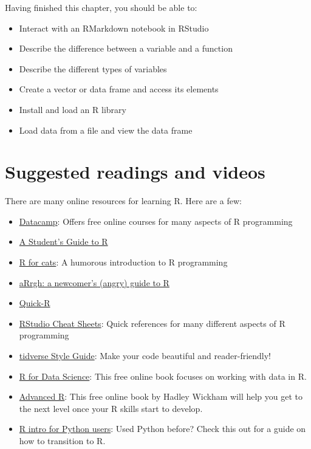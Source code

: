 \documentclass[
  12pt,
]{book}
\providecommand{\tightlist}{%
  \setlength{\itemsep}{0pt}\setlength{\parskip}{0pt}}
\begin{document}
Having finished this chapter, you should be able to:

\begin{itemize}
\tightlist
\item
  Interact with an RMarkdown notebook in RStudio
\item
  Describe the difference between a variable and a function
\item
  Describe the different types of variables
\item
  Create a vector or data frame and access its elements
\item
  Install and load an R library
\item
  Load data from a file and view the data frame
\end{itemize}

\hypertarget{suggested-readings-and-videos}{%
\section{Suggested readings and videos}\label{suggested-readings-and-videos}}

There are many online resources for learning R. Here are a few:

\begin{itemize}
\tightlist
\item
  \href{https://www.datacamp.com/}{Datacamp}: Offers free online courses for many aspects of R programming
\item
  \href{https://cran.r-project.org/doc/contrib/Horton+Pruim+Kaplan_MOSAIC-StudentGuide.pdf}{A Student's Guide to R}
\item
  \href{https://rforcats.net/}{R for cats}: A humorous introduction to R programming
\item
  \href{http://arrgh.tim-smith.us/}{aRrgh: a newcomer's (angry) guide to R}
\item
  \href{http://www.statmethods.net/index.html}{Quick-R}
\item
  \href{https://www.rstudio.com/resources/cheatsheets/}{RStudio Cheat Sheets}: Quick references for many different aspects of R programming
\item
  \href{https://style.tidyverse.org/}{tidverse Style Guide}: Make your code beautiful and reader-friendly!
\item
  \href{http://r4ds.had.co.nz/index.html}{R for Data Science}: This free online book focuses on working with data in R.
\item
  \href{http://adv-r.had.co.nz/}{Advanced R}: This free online book by Hadley Wickham will help you get to the next level once your R skills start to develop.
\item
  \href{http://ramnathv.github.io/pycon2014-r/}{R intro for Python users}: Used Python before? Check this out for a guide on how to transition to R.
\end{itemize}
\end{document}
